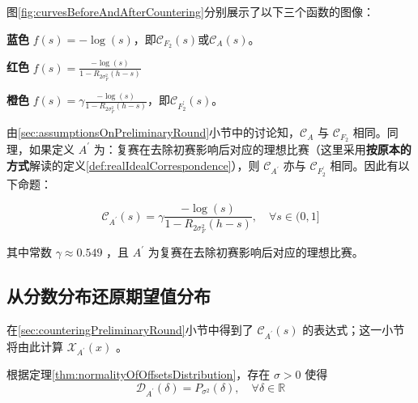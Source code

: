             图\ref{fig:curvesBeforeAndAfterCountering}分别展示了以下三个函数的图像：
            \begin{asparaitem}
                \vspace{1ex}
                \item [\textbf{蓝色}] $f(s)=-\log(s)$，即$\mathcal{C}_{F_2}(s)$或$\mathcal{C}_A(s)$。
                \vspace{1ex}
                \item [\textbf{红色}] $f(s)=\frac{-\log(s)}{1-R_{2\sigma_F^2}(h-s)}$
                \vspace{1ex}
                \item [\textbf{橙色}] $f(s)=\gamma\frac{-\log(s)}{1-R_{2\sigma_F^2}(h-s)}$，即$\mathcal{C}_{F_2^\prime}(s)$。
                \vspace{1ex}
            \end{asparaitem}

            \vspace{1.5ex}

            由\ref{sec:assumptionsOnPreliminaryRound}小节中的讨论知，$\mathcal{C}_A$ 与 $\mathcal{C}_{F_2}$ 相同。同理，如果定义 $A^\prime$ 为：复赛在去除初赛影响后对应的理想比赛（这里采用\textbf{按原本的方式}解读的定义\ref{def:realIdealCorrespondence}），则 $\mathcal{C}_{A^\prime}$ 亦与 $\mathcal{C}_{F_2^\prime}$ 相同。因此有以下命题：

            \begin{proposition}
                $$
                \mathcal{C}_{A^\prime}(s)=\gamma\frac{-\log(s)}{1-R_{2\sigma_F^2}(h-s)},\quad\forall s\in (0,1]
                $$

                其中常数 $\gamma\approx0.549$ ，且 $A^\prime$ 为复赛在去除初赛影响后对应的理想比赛。

                \label{prop:scoreDistributionAfterCountering}
            \end{proposition}

    \subsection{从分数分布还原期望值分布}\label{sec:calculatingXofSecondRound}

        在\ref{sec:counteringPreliminaryRound}小节中得到了 $\mathcal{C}_{A^\prime}(s)$ 的表达式；这一小节将由此计算 $\mathcal{X}_{A^\prime}(x)$ 。

        根据定理\ref{thm:normalityOfOffsetsDistribution}，存在 $\sigma>0$ 使得
        $$
        \mathcal{D}_{A^\prime}(\delta)=P_{\sigma^2}(\delta),\quad\forall \delta\in\mathbb{R}
        $$

